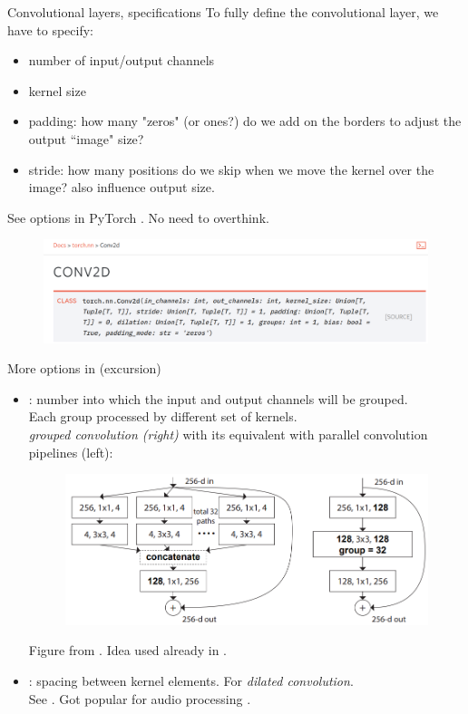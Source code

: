 \begin{frame}{Convolutional layers, specifications}
\vspace{-5mm}
To fully define the convolutional layer, we have to specify:
\begin{itemize}
\item number of input/output channels
\item kernel size
\item padding: how many "zeros" (or ones?) do we add on the borders to adjust the output ``image" size?\\
\item stride: how many positions do we skip when we move the kernel over the image? also influence output size.\\
\end{itemize}
See options in PyTorch . No need to overthink.
\begin{figure}
\centering
\includegraphics[width=.8\linewidth]{./figures/conv2d_pytorch.png}
\end{figure}
\end{frame}

\begin{frame}{More options in  (excursion)}
\begin{itemize}
\item {}: number into which the input and output channels will be grouped.\\
Each group processed by different set of kernels.\\
\textit{grouped convolution (right)} with its equivalent with parallel convolution pipelines (left):
\begin{figure}
\centering
\includegraphics[width=.6\linewidth]{./figures/grouped_conv.png}
\end{figure}
Figure from . Idea used already in .
\vsp
\item {}: spacing between kernel elements. For \textit{dilated convolution}.\\
See .
Got popular for audio processing .
\end{itemize}
\end{frame}


